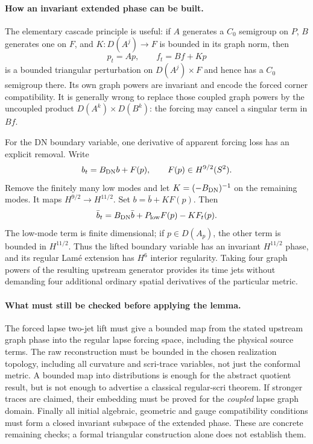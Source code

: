 \paragraph{How an invariant extended phase can be built.}
The elementary cascade principle is useful: if $A$ generates a $C_0$
semigroup on $P$, $B$ generates one on $F$, and
$K:D(A^j)\to F$ is bounded in its graph norm, then
\[
 p_t=Ap,\qquad f_t=Bf+Kp
\]
is a bounded triangular perturbation on $D(A^j)\times F$ and hence has a
$C_0$ semigroup there.  Its own graph powers are invariant and encode the
forced corner compatibility.  It is generally wrong to replace those
coupled graph powers by the uncoupled product $D(A^k)\times D(B^k)$:
the forcing may cancel a singular term in $Bf$.

For the DN boundary variable, one derivative of apparent forcing loss has an
explicit removal.  Write
\[
 b_t=B_{\rm DN}b+F(p),\qquad F(p)\in H^{9/2}(S^2).
\]
Remove the finitely many low modes and let
$K=(-B_{\rm DN})^{-1}$ on the remaining modes.  It maps
$H^{9/2}\to H^{11/2}$.  Set $b=\bar b+KF(p)$.  Then
\[
 \bar b_t=B_{\rm DN}\bar b+P_{\rm low}F(p)-K F_t(p).
\]
The low-mode term is finite dimensional; if $p\in D(A_p)$, the other term
is bounded in $H^{11/2}$.  Thus the lifted boundary variable has an invariant
$H^{11/2}$ phase, and its regular Lam\'e extension has $H^6$ interior
regularity.  Taking four graph powers of the resulting upstream generator
provides its time jets without demanding four additional ordinary spatial
derivatives of the particular metric.

\paragraph{What must still be checked before applying the lemma.}
The forced lapse two-jet lift must give a bounded map from the stated
upstream graph phase into the regular lapse forcing space, including the
physical source terms.  The raw reconstruction must be bounded in the chosen
realization topology, including all curvature and scri-trace variables, not
just the conformal metric.  A bounded map into distributions is enough for
the abstract quotient result, but is not enough to advertise a classical
regular-scri theorem.  If stronger traces are claimed, their embedding must
be proved for the \emph{coupled} lapse graph domain.  Finally all initial
algebraic, geometric and gauge compatibility conditions must form a closed
invariant subspace of the extended phase.  These are concrete remaining
checks; a formal triangular construction alone does not establish them.

